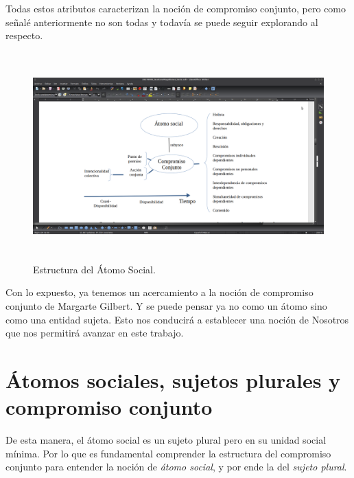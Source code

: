 \documentclass[oneside]{book}
\begin{document}
Todas estos atributos caracterizan la noción de compromiso conjunto, pero como señalé anteriormente no son todas y todavía se puede seguir explorando al respecto.

\begin{figure}[h]
	\centering
	\includegraphics[width=12.5cm, height=8cm]{img/esquema_3}
	\caption{Estructura del Átomo Social.}
\end{figure}

Con lo expuesto, ya tenemos un acercamiento a la noción de compromiso conjunto de Margarte Gilbert. Y se puede pensar ya no como un átomo sino como una entidad sujeta. Esto nos conducirá a establecer una noción de Nosotros que nos permitirá avanzar en este trabajo.

\section{Átomos sociales, sujetos plurales y compromiso conjunto}


De esta manera, el átomo social es un sujeto plural pero en su unidad social mínima. Por lo que es fundamental comprender la estructura del compromiso conjunto para entender la noción de \textit{átomo social}, y por ende la del \textit{sujeto plural}.
\end{document}
